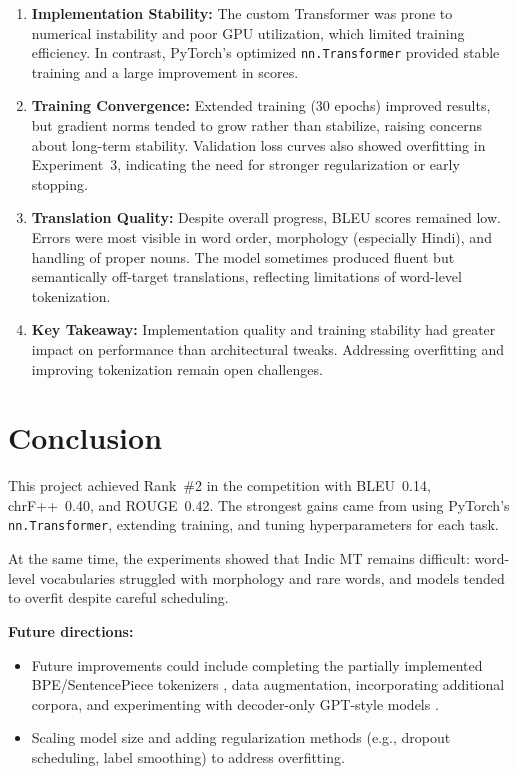 \documentclass[11pt, oneside]{article}   	%
\begin{document}
\begin{enumerate}
\item \textbf{Implementation Stability:} The custom Transformer was prone to numerical instability and poor GPU utilization, which limited training efficiency. In contrast, PyTorch’s optimized \texttt{nn.Transformer} provided stable training and a large improvement in scores.  

\item \textbf{Training Convergence:} Extended training (30 epochs) improved results, but gradient norms tended to grow rather than stabilize, raising concerns about long-term stability. Validation loss curves also showed overfitting in Experiment~3, indicating the need for stronger regularization or early stopping.  

\item \textbf{Translation Quality:} Despite overall progress, BLEU scores remained low. Errors were most visible in word order, morphology (especially Hindi), and handling of proper nouns. The model sometimes produced fluent but semantically off-target translations, reflecting limitations of word-level tokenization.  

\item \textbf{Key Takeaway:} Implementation quality and training stability had greater impact on performance than architectural tweaks. Addressing overfitting and improving tokenization remain open challenges.  
\end{enumerate}

\section{Conclusion}

This project achieved Rank~\#2 in the competition with BLEU~0.14, chrF++~0.40, and ROUGE~0.42. The strongest gains came from using PyTorch’s \texttt{nn.Transformer}, extending training, and tuning hyperparameters for each task.  

At the same time, the experiments showed that Indic MT remains difficult: word-level vocabularies struggled with morphology and rare words, and models tended to overfit despite careful scheduling.  

\textbf{Future directions:}  
\begin{itemize}
    \item Future improvements could include completing the partially implemented BPE/SentencePiece tokenizers \cite{sennrich2016neural,kudo2018sentencepiece}, data augmentation, incorporating additional corpora, and experimenting with decoder-only GPT-style models \cite{radford2019language,brown2020language}.
    \item Scaling model size and adding regularization methods (e.g., dropout scheduling, label smoothing) to address overfitting.  
\end{itemize}
\end{document}
